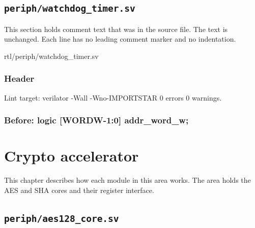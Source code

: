 \section{\texttt{periph/watchdog\_timer.sv}}\label{tm:mod:watchdog-timer}

This section holds comment text that was in the source file. The text is unchanged. Each line has no leading comment marker and no indentation.

\begin{relocated}{rtl/periph/watchdog_timer.sv}

\subsection*{Header}

\begin{textblock}
Lint target: verilator -Wall -Wno-IMPORTSTAR 0 errors 0 warnings.
\end{textblock}

\subsection*{Before: logic [WORDW-1:0] addr\_word\_w;}


\end{relocated}








\chapter{Crypto accelerator}\label{tm:ch:mod-crypto-accelerator}

This chapter describes how each module in this area works. The area holds the AES and SHA cores and their register interface.

\section{\texttt{periph/aes128\_core.sv}}\label{tm:mod:aes128-core}

